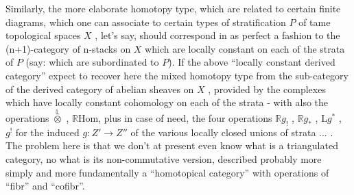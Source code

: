 Similarly, the more elaborate homotopy type, which are related to certain
finite diagrams, which one can associate to certain types of stratification
$P$ of tame topological spaces $X$ , let's say, should correspond in as perfect
a fashion to the (n+1)-category of n-stacks on $X$ which are locally constant
on each of the strata of $P$ (say: which are subordinated to $P$). If the
above  ``locally constant derived category''  
 expect to recover here the mixed homotopy type from the  sub-category of the
derived category of abelian sheaves on $X$ , provided by the complexes which
have locally constant cohomology on each of the strata - with also the
operations $\overset{\mathbb{L}}{\otimes}$ , $\mathbb{R}\mathrm{Hom}$, plus in case of need, the four operations
$\mathbb{R}g_!$ , $\mathbb{R}g_*$ , $\mathrm{L}g^*$ , $g^!$ for the induced $g : Z' \to Z''$ of the various locally
closed unions of strata ... . The problem here is that we don't at present
even know what is a triangulated category, no  what is its non-commutative
version, described probably more simply and more fundamentally\unsure{\over{;}{:}}  a
``homotopical category'' with operations of  ``fibr'' and ``cofibr''.

